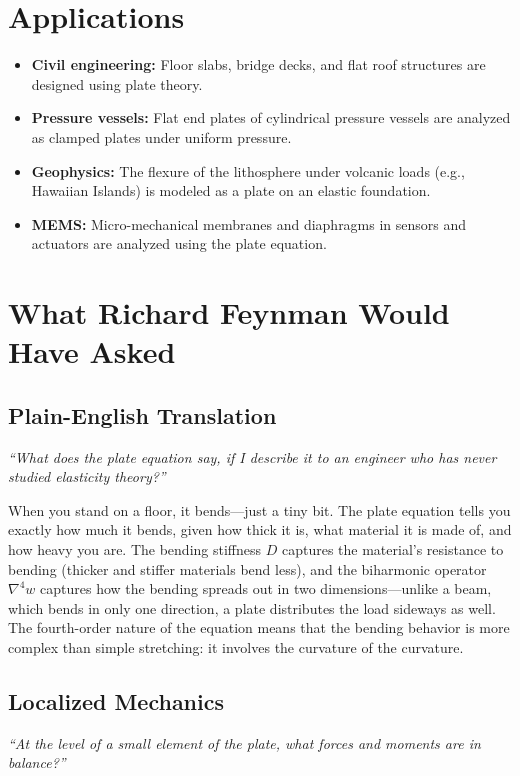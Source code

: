 \section*{Applications}

\begin{itemize}
  \item \textbf{Civil engineering:} Floor slabs, bridge decks, and flat roof structures are designed using plate theory.
  \item \textbf{Pressure vessels:} Flat end plates of cylindrical pressure vessels are analyzed as clamped plates under uniform pressure.
  \item \textbf{Geophysics:} The flexure of the lithosphere under volcanic loads (e.g., Hawaiian Islands) is modeled as a plate on an elastic foundation.
  \item \textbf{MEMS:} Micro-mechanical membranes and diaphragms in sensors and actuators are analyzed using the plate equation.
\end{itemize}
\section*{What Richard Feynman Would Have Asked}

\subsection*{Plain-English Translation}
\textit{``What does the plate equation say, if I describe it to an engineer who has never studied elasticity theory?''}

When you stand on a floor, it bends---just a tiny bit. The plate equation tells you exactly how much it bends, given how thick it is, what material it is made of, and how heavy you are. The bending stiffness $D$ captures the material's resistance to bending (thicker and stiffer materials bend less), and the biharmonic operator $\nabla^{4}w$ captures how the bending spreads out in two dimensions---unlike a beam, which bends in only one direction, a plate distributes the load sideways as well. The fourth-order nature of the equation means that the bending behavior is more complex than simple stretching: it involves the curvature of the curvature.

\subsection*{Localized Mechanics}
\textit{``At the level of a small element of the plate, what forces and moments are in balance?''}

